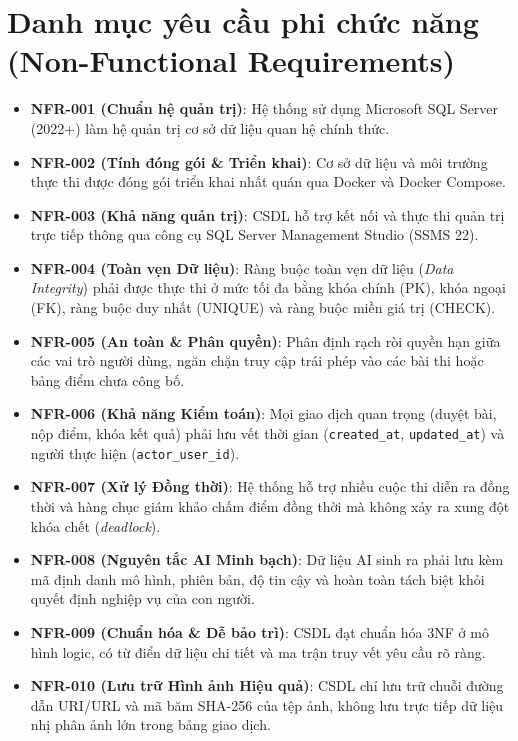 \section{Danh mục yêu cầu phi chức năng (Non-Functional Requirements)}
\label{s:c2_nfr}

\begin{itemize}
    \item \textbf{NFR-001 (Chuẩn hệ quản trị)}: Hệ thống sử dụng Microsoft SQL Server (2022+) làm hệ quản trị cơ sở dữ liệu quan hệ chính thức.
    \item \textbf{NFR-002 (Tính đóng gói \& Triển khai)}: Cơ sở dữ liệu và môi trường thực thi được đóng gói triển khai nhất quán qua Docker và Docker Compose.
    \item \textbf{NFR-003 (Khả năng quản trị)}: CSDL hỗ trợ kết nối và thực thi quản trị trực tiếp thông qua công cụ SQL Server Management Studio (SSMS 22).
    \item \textbf{NFR-004 (Toàn vẹn Dữ liệu)}: Ràng buộc toàn vẹn dữ liệu (\textit{Data Integrity}) phải được thực thi ở mức tối đa bằng khóa chính (PK), khóa ngoại (FK), ràng buộc duy nhất (UNIQUE) và ràng buộc miền giá trị (CHECK).
    \item \textbf{NFR-005 (An toàn \& Phân quyền)}: Phân định rạch ròi quyền hạn giữa các vai trò người dùng, ngăn chặn truy cập trái phép vào các bài thi hoặc bảng điểm chưa công bố.
    \item \textbf{NFR-006 (Khả năng Kiểm toán)}: Mọi giao dịch quan trọng (duyệt bài, nộp điểm, khóa kết quả) phải lưu vết thời gian (\texttt{created\_at}, \texttt{updated\_at}) và người thực hiện (\texttt{actor\_user\_id}).
    \item \textbf{NFR-007 (Xử lý Đồng thời)}: Hệ thống hỗ trợ nhiều cuộc thi diễn ra đồng thời và hàng chục giám khảo chấm điểm đồng thời mà không xảy ra xung đột khóa chết (\textit{deadlock}).
    \item \textbf{NFR-008 (Nguyên tắc AI Minh bạch)}: Dữ liệu AI sinh ra phải lưu kèm mã định danh mô hình, phiên bản, độ tin cậy và hoàn toàn tách biệt khỏi quyết định nghiệp vụ của con người.
    \item \textbf{NFR-009 (Chuẩn hóa \& Dễ bảo trì)}: CSDL đạt chuẩn hóa 3NF ở mô hình logic, có từ điển dữ liệu chi tiết và ma trận truy vết yêu cầu rõ ràng.
    \item \textbf{NFR-010 (Lưu trữ Hình ảnh Hiệu quả)}: CSDL chỉ lưu trữ chuỗi đường dẫn URI/URL và mã băm SHA-256 của tệp ảnh, không lưu trực tiếp dữ liệu nhị phân ảnh lớn trong bảng giao dịch.
\end{itemize}

